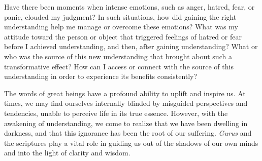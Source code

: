 
\newpage
\begin{mananam}{}
\normalfont\mananamtext Have there been moments when intense emotions, such as anger, hatred, fear, or panic, clouded my judgment? In such situations, how did gaining the right understanding help me manage or overcome these emotions?
What was my attitude toward the person or object that triggered feelings of hatred or fear before I achieved understanding, and then, after gaining understanding?
What or who was the source of this new understanding that brought about such a transformative effect? How can I access or connect with the source of this understanding in order to experience its benefits consistently?
\end{mananam}
\sreflect
\begin{inspiration}{}
\normalfont\mananamtext The words of great beings have a profound ability to uplift and inspire us. At times, we may find ourselves internally blinded by misguided perspectives and tendencies, unable to perceive life in its true essence. However, with the awakening of understanding, we come to realize that we have been dwelling in darkness, and that this ignorance has been the root of our suffering. \emph{Gurus} and the scriptures play a vital role in guiding us out of the shadows of our own minds and into the light of clarity and wisdom.
\end{inspiration}
\newpage

